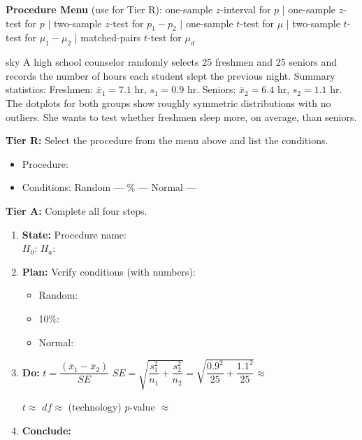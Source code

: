 \documentclass[10pt]{article}
\begin{document}
\namepartnerperiod

\vspace{0.10in}

\textbf{Procedure Menu} (use for Tier R): one-sample $z$-interval for $p$ \;|\;
one-sample $z$-test for $p$ \;|\; two-sample $z$-test for $p_1-p_2$ \;|\;
one-sample $t$-test for $\mu$ \;|\; two-sample $t$-test for $\mu_1-\mu_2$ \;|\;
matched-pairs $t$-test for $\mu_d$

\vspace{0.08in}

\begin{scenariobox}{sky}
A high school counselor randomly selects 25 freshmen and 25 seniors and records the
number of hours each student slept the previous night. Summary statistics:
Freshmen: $\bar x_1 = 7.1$ hr, $s_1 = 0.9$ hr. \;
Seniors: $\bar x_2 = 6.4$ hr, $s_2 = 1.1$ hr.
The dotplots for both groups show roughly symmetric distributions with no outliers.
She wants to test whether freshmen sleep more, on average, than seniors.

\textbf{Tier R:} Select the procedure from the menu above and list the conditions.
\begin{itemize}
  \item Procedure: \blank{8cm}
  \item Conditions: Random --- \blank{4cm} \% --- \blank{4cm} \; Normal --- \blank{4cm}
\end{itemize}

\textbf{Tier A:} Complete all four steps.
\begin{enumerate}
  \item \textbf{State:} Procedure name: \blank{7cm} \\
        $H_0$: \blank{5cm} \quad $H_a$: \blank{5cm}
  \item \textbf{Plan:} Verify conditions (with numbers):
        \begin{itemize}
          \item Random: \writeline
          \item 10\%: \writeline
          \item Normal: \writeline
        \end{itemize}
  \item \textbf{Do:} $t = \dfrac{(\bar x_1 - \bar x_2)}{SE}$ \quad
        $SE = \sqrt{\dfrac{s_1^2}{n_1} + \dfrac{s_2^2}{n_2}} = \sqrt{\dfrac{0.9^2}{25} + \dfrac{1.1^2}{25}} \approx$ \blank{2cm}

        $t \approx$ \blank{2cm} \quad $df \approx$ \blank{2cm} (technology) \quad $p$-value $\approx$ \blank{2.5cm}
  \item \textbf{Conclude:} \writeline \writeline
\end{enumerate}
\end{scenariobox}
\end{document}
